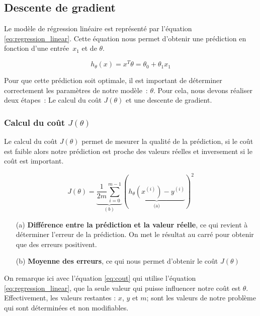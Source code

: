 \subsection{Descente de gradient}

Le modèle de régression linéaire est représenté par l'équation \ref{eq:regression_linear}. Cette équation nous permet d'obtenir une prédiction en fonction d'une entrée~$x_1$ et de $\theta$.

\begin{equation}\label{eq:regression_linear}
    h_\theta(x) = x^T \theta =\theta_0 + \theta_1 x_1
\end{equation}

\noindent
Pour que cette prédiction soit optimale, il est important de déterminer correctement les paramètres de notre modèle~: $\theta$. Pour cela, nous devons réaliser deux étapes~: Le calcul du coût $J(\theta)$ et une descente de gradient.
    


\subsubsection{Calcul du coût $J(\theta)$}
Le calcul du coût $J(\theta)$ permet de mesurer la qualité de la prédiction, si le coût est faible alors notre prédiction est proche des valeurs réelles et inversement si le coût est important.

\begin{equation}\label{eq:cout}
   J(\theta) = \underbrace{\frac{1}{2m} \sum_{i=0}^{m-1}}_{(b)}(\underbrace{h_\theta(x^{(i)}) - y^{(i)}}_{\text{(a)}})^2
\end{equation}

\begin{itemize}
    \item [(a)] \textbf{Différence entre la prédiction et la valeur réelle}, ce qui revient à déterminer l'erreur de la prédiction. On met le résultat au carré pour obtenir que des erreurs positivent.
    \item [(b)] \textbf{Moyenne des erreurs}, ce qui nous permet d'obtenir le coût $J(\theta)$
\end{itemize}

\vspace{.3cm}

On remarque ici avec l'équation \ref{eq:cout} qui utilise l'équation \ref{eq:regression_linear}, que la seule valeur qui puisse influencer notre coût est $\theta$. Effectivement, les valeurs restantes : $x$, $y$ et $m$; sont les valeurs
de notre problème qui sont déterminées et non modifiables.


